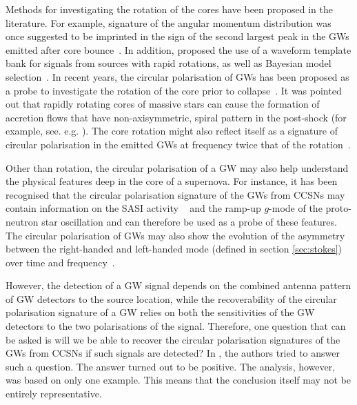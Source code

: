 \documentclass[aps,twocolumn,showpacs,groupedaddress, nofootinbib]{revtex4}  %
\begin{document}
Methods for investigating the rotation of the cores have been proposed in the literature.
For example, signature of the angular momentum distribution was once suggested to be 
imprinted in the sign of the second largest peak in the \acp{GW} emitted after core bounce~\cite{hayama2008determination}.
In addition, \cite{abdikamalov2014measuring} proposed the use of a waveform template 
bank for signals from sources with rapid rotations, as well as Bayesian model selection~\cite{abdikamalov2014measuring}.
In recent years, the circular polarisation of \acp{GW} has been proposed as a probe
to investigate the rotation of the core prior to collapse~\cite{hayama2016circular, hayama2018circular}. 
It was pointed out that rapidly rotating cores of massive stars can cause the formation of accretion flows that have non-axisymmetric, 
spiral pattern in the post-shock (for example, see. e.g. \cite{kuroda2014gravitational, seto2007measuring}). 
The core rotation might also reflect itself as a signature of circular polarisation in the emitted \acp{GW} at frequency
twice that of the rotation~\cite{hayama2016circular}.

Other than rotation, the circular polarisation of a \ac{GW} may also help understand the physical features deep in 
the core of a supernova.
For instance, it has been recognised that the circular polarisation signature of the \acp{GW} from \acp{CCSN}
may contain information on the \ac{SASI} activity ~\cite{kuroda2016new, andresen2017gravitational, hayama2018circular}
and the ramp-up $g$-mode of the proto-neutron star oscillation and can therefore be used as a probe of these features.
The circular polarisation of \acp{GW} may also show the evolution of the asymmetry between the right-handed and left-handed mode (defined in section \ref{sec:stokes}) 
over time and frequency~\cite{hayama2018circular}.

However, the detection of a \ac{GW} signal depends on the combined antenna pattern of \ac{GW} detectors to the source location,
while the recoverability of the circular polarisation signature of a \ac{GW} relies on both the sensitivities of the \ac{GW} detectors to the two polarisations of the signal. 
Therefore, one question that can be asked is will we be able to recover the circular polarisation signatures of the \acp{GW} 
from \acp{CCSN} if such signals are detected? 
In \cite{hayama2018circular}, the authors tried to answer such a question. 
The answer turned out to be positive. The analysis, however, was based on only one example.
This means that the conclusion itself may not be entirely representative.
\end{document}
